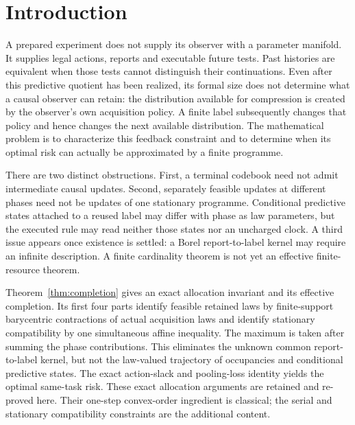 \section{Introduction}\label{sec:introduction}
A prepared experiment does not supply its observer with a parameter manifold. It supplies legal actions, reports and executable future tests. Past histories are equivalent when those tests cannot distinguish their continuations. Even after this predictive quotient has been realized, its formal size does not determine what a causal observer can retain: the distribution available for compression is created by the observer's own acquisition policy. A finite label subsequently changes that policy and hence changes the next available distribution. The mathematical problem is to characterize this feedback constraint and to determine when its optimal risk can actually be approximated by a finite programme.

There are two distinct obstructions. First, a terminal codebook need not admit intermediate causal updates. Second, separately feasible updates at different phases need not be updates of one stationary programme. Conditional predictive states attached to a reused label may differ with phase as law parameters, but the executed rule may read neither those states nor an uncharged clock. A third issue appears once existence is settled: a Borel report-to-label kernel may require an infinite description. A finite cardinality theorem is not yet an effective finite-resource theorem.

Theorem~\ref{thm:completion} gives an exact allocation invariant and its effective completion. Its first four parts identify feasible retained laws by finite-support barycentric contractions of actual acquisition laws and identify stationary compatibility by one simultaneous affine inequality. The maximum is taken after summing the phase contributions. This eliminates the unknown common report-to-label kernel, but not the law-valued trajectory of occupancies and conditional predictive states. The exact action-slack and pooling-loss identity yields the optimal same-task risk. These exact allocation arguments are retained and re-proved here. Their one-step convex-order ingredient is classical\cite{strassen,leskela}; the serial and stationary compatibility constraints are the additional content.


